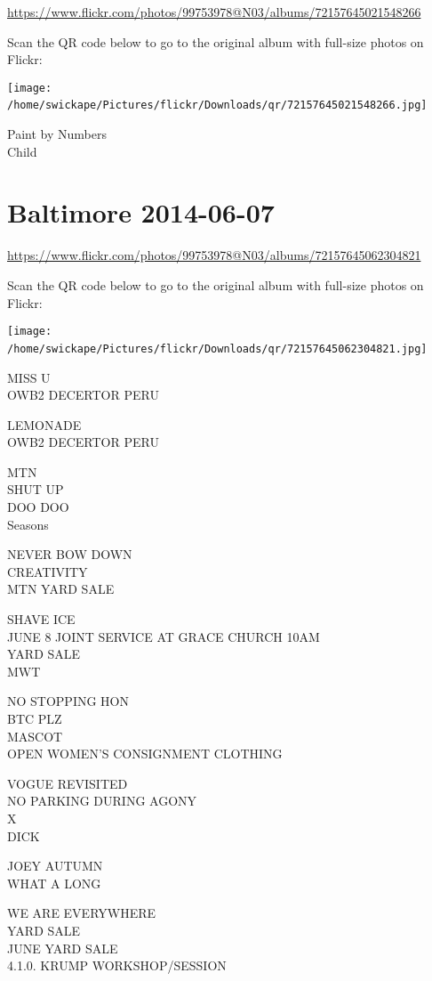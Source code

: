 \documentclass[10pt,letterpaper]{article}
\begin{document}
\url{https://www.flickr.com/photos/99753978@N03/albums/72157645021548266}

Scan the QR code below to go to the original album with full-size photos on Flickr:

\texttt{[image: /home/swickape/Pictures/flickr/Downloads/qr/72157645021548266.jpg]}
\

Paint by Numbers\\
Child
\

\section*{Baltimore 2014-06-07}

\url{https://www.flickr.com/photos/99753978@N03/albums/72157645062304821}

Scan the QR code below to go to the original album with full-size photos on Flickr:

\texttt{[image: /home/swickape/Pictures/flickr/Downloads/qr/72157645062304821.jpg]}
\

MISS U\\
OWB2 DECERTOR PERU

LEMONADE\\
OWB2 DECERTOR PERU

MTN\\
SHUT UP\\
DOO DOO\\
Seasons

NEVER BOW DOWN\\
CREATIVITY\\
MTN YARD SALE

SHAVE ICE\\
JUNE 8 JOINT SERVICE AT GRACE CHURCH 10AM\\
YARD SALE\\
MWT

NO STOPPING HON\\
BTC PLZ\\
MASCOT\\
OPEN WOMEN'S CONSIGNMENT CLOTHING

VOGUE REVISITED\\
NO PARKING DURING AGONY\\
X\\
DICK

JOEY AUTUMN\\
WHAT A LONG

WE ARE EVERYWHERE\\
YARD SALE\\
JUNE YARD SALE\\
4.1.0. KRUMP WORKSHOP/SESSION
\end{document}
